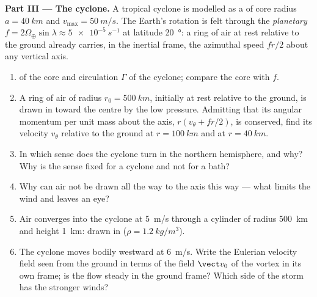 \begin{problem}
\medskip
\noindent\textbf{Part III --- The cyclone.}
A tropical cyclone is modelled as a  of core radius
$a = \qty{40}{km}$ and $v_{\max} = \qty{50}{m/s}$. The Earth's rotation is
felt through the \emph{planetary } $f = 2\Omega_\oplus\sin\lambda
\approx \qty{5e-5}{s^{-1}}$ at latitude \qty{20}{\degree}: a ring of air at
rest relative to the ground already carries, in the inertial frame, the
azimuthal speed $fr/2$ about any vertical axis.
\begin{enumerate}[resume]
  \item {} of the core and circulation $\Gamma$ of the cyclone;
        compare the core  with $f$.
  \item A ring of air of radius $r_0 = \qty{500}{km}$, initially at rest
        relative to the ground, is drawn in toward the centre by the
        low pressure. Admitting that its angular momentum per unit mass
        about the axis, $r(v_\theta + fr/2)$, is conserved, find its
        velocity $v_\theta$ relative to the ground at $r = \qty{100}{km}$
        and at $r = \qty{40}{km}$.
  \item In which sense does the cyclone turn in the northern
        hemisphere, and why? Why is the sense fixed for a cyclone and
        not for a bath?
  \item Why can air not be drawn all the way to the axis this way ---
        what limits the wind and leaves an eye?
  \item Air converges into the cyclone at \qty{5}{m/s} through a
        cylinder of radius \qty{500}{km} and height \qty{1}{km}:  drawn in ($\rho = \qty{1.2}{kg/m^3}$).
  \item The cyclone moves bodily westward at \qty{6}{m/s}. Write the
        Eulerian velocity field seen from the ground in terms of the
        field $\vect v_0$ of the vortex in its own frame; is the flow
        steady in the ground frame? Which side of the storm has the
        stronger winds?
\end{enumerate}


\end{problem}
